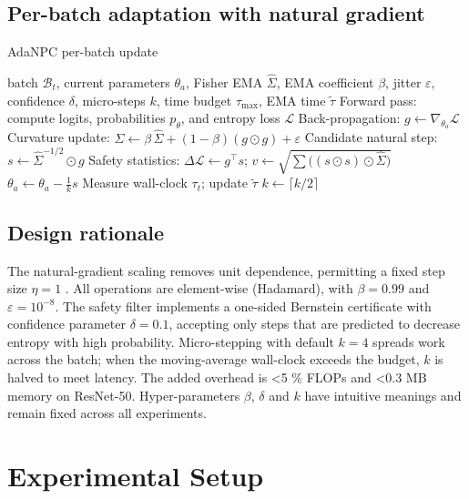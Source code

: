 \documentclass{article} %
\begin{document}
\subsection{Per-batch adaptation with natural gradient}
\begin{algorithm}[t]
\caption{AdaNPC per-batch update}
\begin{algorithmic}[1]
\Require batch \(\mathcal{B}_t\), current parameters \(\theta_a\), Fisher EMA \(\hat{\Sigma}\), EMA coefficient \(\beta\), jitter \(\varepsilon\), confidence \(\delta\), micro-steps \(k\), time budget \(\tau_{\max}\), EMA time \(\tilde{\tau}\)
\State Forward pass: compute logits, probabilities \(p_{\theta}\), and entropy loss \(\mathcal{L}\)
\State Back-propagation: \(g \leftarrow \nabla_{\theta_a} \mathcal{L}\)
\State Curvature update: \(\hat{\Sigma} \leftarrow \beta\,\hat{\Sigma} + (1-\beta) (g \odot g) + \varepsilon\)
\State Candidate natural step: \(s \leftarrow \hat{\Sigma}^{-1/2} \odot g\)
\State Safety statistics: \(\Delta \mathcal{L} \leftarrow g^{\top} s\); \(v \leftarrow \sqrt{\sum \big( (s \odot s) \odot \hat{\Sigma} \big)}\)
    \State \(\theta_a \leftarrow \theta_a - \tfrac{1}{k} s\)
  \EndFor
\EndIf
\State Measure wall-clock \(\tau_t\); update \(\tilde{\tau}\)
  \State \(k \leftarrow \lceil k/2 \rceil\)
\EndIf
\end{algorithmic}
\end{algorithm}
\subsection{Design rationale}
The natural-gradient scaling removes unit dependence, permitting a fixed step size \(\eta = 1\) \cite{aitchison-2018-bayesian}. All operations are element-wise (Hadamard), with \(\beta = 0.99\) and \(\varepsilon = 10^{-8}\). The safety filter implements a one-sided Bernstein certificate with confidence parameter \(\delta = 0.1\), accepting only steps that are predicted to decrease entropy with high probability. Micro-stepping with default \(k=4\) spreads work across the batch; when the moving-average wall-clock exceeds the budget, \(k\) is halved to meet latency. The added overhead is <5 \% FLOPs and <0.3 MB memory on ResNet-50. Hyper-parameters \(\beta\), \(\delta\) and \(k\) have intuitive meanings and remain fixed across all experiments.

\section{Experimental Setup}
\label{sec:experimental}
\end{document}
